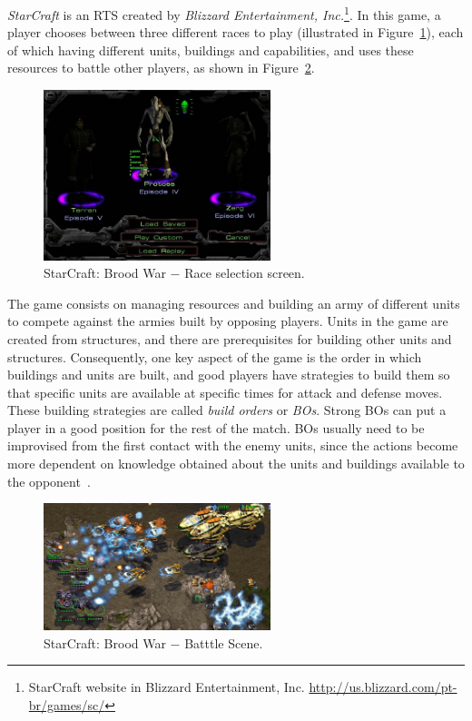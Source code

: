 \textit{StarCraft} is an RTS created by \textit{Blizzard Entertainment, Inc.}\footnote{
StarCraft website in Blizzard Entertainment, Inc. \url{http://us.blizzard.com/pt-br/games/sc/}}.
In this game, a player chooses between three different races to play (illustrated in Figure~\ref{fig:sc-races}), each of which having different units, buildings and capabilities, and uses these resources to battle other players, as shown in Figure~\ref{fig:sc-fight}. 
% 
\begin{figure}[ht]
\centering
\includegraphics[width=250px]{images/sc-races}
\caption{StarCraft: Brood War $-$ Race selection screen.}
\label{fig:sc-races}
\end{figure}
% 
The game consists on managing resources and building an army of different units to compete against the armies built by opposing players. 
Units in the game are created from structures, and there are prerequisites for building other units and structures. 
Consequently, one key aspect of the game is the order in which buildings and units are built, and good players have strategies to build them so that specific units are available at specific times for attack and defense moves. 
These building strategies are called \textit{build orders} or \textit{BOs}. 
Strong BOs can put a player in a good position for the rest of the match.
BOs usually need to be improvised from the first contact with the enemy units, since the actions become more dependent on knowledge obtained about the units and buildings available to the opponent~\cite{hagelback2012potential,churchill2011build}. 
% 
\begin{figure}[ht]
\centering
\includegraphics[width=250px]{images/sc-fight}
\caption{StarCraft: Brood War $-$ Batttle Scene.}
\label{fig:sc-fight}
\end{figure}
